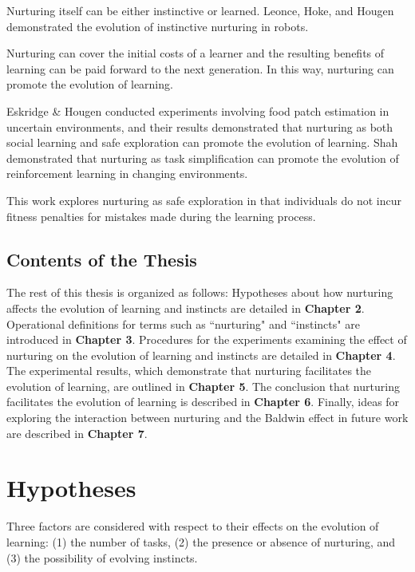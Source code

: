 \documentclass[master]{outhesis}
\begin{document}
Nurturing itself can be either instinctive or learned.
Leonce, Hoke, and Hougen \cite{evolution-of-nurturing} demonstrated the evolution of instinctive nurturing in robots.


Nurturing can cover the initial costs of a learner and the resulting benefits of learning can be paid forward to the next generation.
In this way, nurturing can promote the evolution of learning.

Eskridge \& Hougen \cite{eskridge-learning-uncertain-environments} conducted experiments involving food patch estimation in uncertain environments,
and their results demonstrated that nurturing as both social learning and safe exploration can promote the evolution of learning.
Shah \cite{Shah:2015hs} demonstrated that nurturing as task simplification can promote the evolution of reinforcement learning in changing environments.

This work explores nurturing as safe exploration in that individuals do not incur fitness penalties for mistakes made during the learning process.

\section{Contents of the Thesis}

The rest of this thesis is organized as follows:
Hypotheses about how nurturing affects the evolution of learning and instincts are detailed in \textbf{Chapter 2}. 
Operational definitions for terms such as ``nurturing" and ``instincts" are introduced in \textbf{Chapter 3}.
Procedures for the experiments examining the effect of nurturing on the evolution of learning and instincts are detailed in \textbf{Chapter 4}.
The experimental results, which demonstrate that nurturing facilitates the evolution of learning, are outlined in \textbf{Chapter 5}. 
The conclusion that nurturing facilitates the evolution of learning is described in \textbf{Chapter 6}. 
Finally, ideas for exploring the interaction between nurturing and the Baldwin effect in future work are described in \textbf{Chapter 7}.

\chapter{Hypotheses}

Three factors are considered with respect to their effects on the evolution of learning:
(1) the number of tasks,
(2) the presence or absence of nurturing, and
(3) the possibility of evolving instincts.
\end{document}
